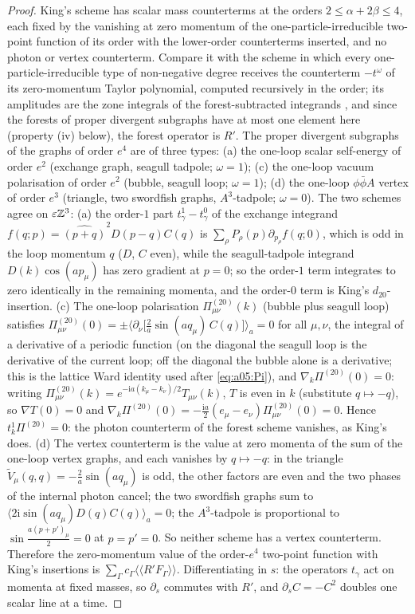 \begin{proof}
King's scheme \cite[(3.32)--(3.33)]{K1} has scalar mass counterterms at the orders $2\le\alpha+2\beta\le4$, each fixed by the vanishing at zero momentum of the one-particle-irreducible two-point function of its order with the lower-order counterterms inserted, and no photon or vertex counterterm. Compare it with the scheme in which every one-particle-irreducible type of non-negative degree receives the counterterm $-t^{\omega}$ of its zero-momentum Taylor polynomial, computed recursively in the order; its amplitudes are the zone integrals of the forest-subtracted integrands \cite[Sect.~4]{Rei88b}, and since the forests of proper divergent subgraphs have at most one element here (property (iv) below), the forest operator is $R'$. The proper divergent subgraphs of the graphs of order $e^4$ are of three types: (a) the one-loop scalar self-energy of order $e^2$ (exchange graph, seagull tadpole; $\omega=1$); (c) the one-loop vacuum polarisation of order $e^2$ (bubble, seagull loop; $\omega=1$); (d) the one-loop $\phi\bar\phi A$ vertex of order $e^3$ (triangle, two swordfish graphs, $A^3$-tadpole; $\omega=0$). The two schemes agree on $\varepsilon\mathbb Z^3$:
(a) the order-$1$ part $t^1_\gamma-t^0_\gamma$ of the exchange integrand $f(q;p)=\widehat{(p+q)}^2D(p-q)C(q)$ is $\sum_\rho P_\rho(p)\partial_{p_\rho}f(q;0)$, which is odd in the loop momentum $q$ ($D$, $C$ even), while the seagull-tadpole integrand $D(k)\cos(ap_\mu)$ has zero gradient at $p=0$; so the order-$1$ term integrates to zero identically in the remaining momenta, and the order-$0$ term is King's $d_{20}$-insertion.
(c) The one-loop polarisation $\Pi^{(20)}_{\mu\nu}(k)$ (bubble plus seagull loop) satisfies $\Pi^{(20)}_{\mu\nu}(0)=\pm\big\langle\partial_\nu\big[\tfrac2a\sin(aq_\mu)\,C(q)\big]\big\rangle_a=0$ for all $\mu,\nu$, the integral of a derivative of a periodic function (on the diagonal the seagull loop is the derivative of the current loop; off the diagonal the bubble alone is a derivative; this is the lattice Ward identity used after \eqref{eq:a05:Pi}), and $\nabla_k\Pi^{(20)}(0)=0$: writing $\Pi^{(20)}_{\mu\nu}(k)=e^{-\mathrm ia(k_\mu-k_\nu)/2}T_{\mu\nu}(k)$, $T$ is even in $k$ (substitute $q\mapsto-q$), so $\nabla T(0)=0$ and $\nabla_k\Pi^{(20)}(0)=-\frac{\mathrm ia}2(e_\mu-e_\nu)\Pi^{(20)}_{\mu\nu}(0)=0$. Hence $t^1_k\Pi^{(20)}=0$: the photon counterterm of the forest scheme vanishes, as King's does.
(d) The vertex counterterm is the value at zero momenta of the sum of the one-loop vertex graphs, and each vanishes by $q\mapsto-q$: in the triangle $\tilde V_\mu(q,q)=-\frac2a\sin(aq_\mu)$ is odd, the other factors are even and the two phases of the internal photon cancel; the two swordfish graphs sum to $\langle2\mathrm i\sin(aq_\mu)D(q)C(q)\rangle_a=0$; the $A^3$-tadpole is proportional to $\sin\frac{a(p+p')_\mu}2=0$ at $p=p'=0$. So neither scheme has a vertex counterterm.
Therefore the zero-momentum value of the order-$e^4$ two-point function with King's insertions is $\sum_\Gamma c_\Gamma\langle\langle R'F_\Gamma\rangle\rangle$. Differentiating in $s$: the operators $t_\gamma$ act on momenta at fixed masses, so $\partial_s$ commutes with $R'$, and $\partial_sC=-C^2$ doubles one scalar line at a time.
\end{proof}

